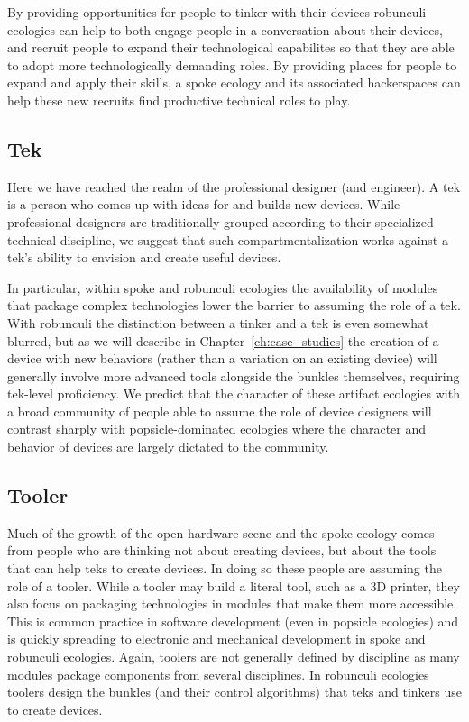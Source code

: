 By providing opportunities for people to tinker with their devices robunculi ecologies can help to both engage people in a conversation about their devices, and recruit people to expand their technological capabilites so that they are able to adopt more technologically demanding roles. By providing places for people to expand and apply their skills, a spoke ecology and its associated hackerspaces can help these new recruits find productive technical roles to play.

\subsection{Tek}
Here we have reached the realm of the professional designer (and engineer). A tek is a person who comes up with ideas for and builds new devices. 
While professional designers are traditionally grouped according to their specialized technical discipline, we suggest that such compartmentalization works against a tek's ability to envision and create useful devices. 

In particular, within spoke and robunculi ecologies the availability of modules that package complex technologies lower the barrier to assuming the role of a tek. 
With robunculi the distinction between a tinker and a tek is even somewhat blurred, but as we will describe in Chapter~\ref{ch:case_studies} the creation of a device with new behaviors (rather than a variation on an existing device) will generally involve more advanced tools alongside the bunkles themselves, requiring tek-level proficiency.
We predict that the character of these artifact ecologies with a broad community of people able to assume the role of device designers will contrast sharply with popsicle-dominated ecologies where the character and behavior of devices are largely dictated to the community.

\subsection{Tooler}
Much of the growth of the open hardware scene and the spoke ecology comes from people who are thinking not about creating devices, but about the tools that can help teks to create devices. In doing so these people are assuming the role of a tooler. While a tooler may build a literal tool, such as a 3D printer, they also focus on packaging technologies in modules that make them more accessible. This is common practice in software development (even in popsicle ecologies) and is quickly spreading to electronic and mechanical development in spoke and robunculi ecologies. Again, toolers are not generally defined by discipline as many modules package components from several disciplines. In robunculi ecologies toolers design the bunkles (and their control algorithms) that teks and tinkers use to create devices.

